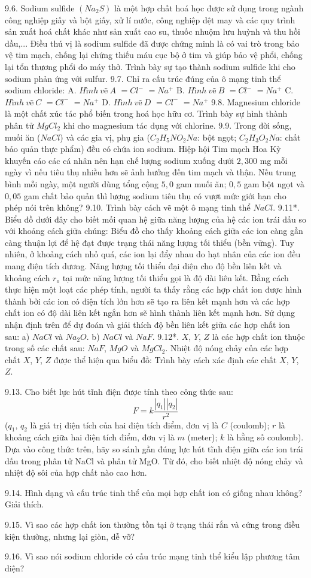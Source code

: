 9.6. Sodium sulfide $(Na_2S)$ là một hợp chất hoá học được sử dụng trong ngành công nghiệp giấy và bột giấy, xử lí nước, công nghiệp dệt may và các quy trình sản xuất hoá chất khác như sản xuất cao su, thuốc nhuộm lưu huỳnh và thu hồi dầu,... Điều thú vị là sodium sulfide đã được chứng minh là có vai trò trong bảo vệ tim mạch, chống lại chứng thiếu máu cục bộ ở tim và giúp bảo vệ phổi, chống lại tổn thương phổi do máy thở. Trình bày sự tạo thành sodium sulfide khi cho sodium phản ứng với sulfur.
9.7. Chỉ ra cấu trúc đúng của ô mạng tinh thể sodium chloride:
A. {$Hình\ vẽ\ A$}
$= Cl^-$ $= Na^+$
B. {$Hình\ vẽ\ B$}
$= Cl^-$ $= Na^+$
C. {$Hình\ vẽ\ C$}
$= Cl^-$ $= Na^+$
D. {$Hình\ vẽ\ D$}
$= Cl^-$ $= Na^+$
9.8. Magnesium chloride là một chất xúc tác phổ biến trong hoá học hữu cơ. Trình bày sự hình thành phân tử $MgCl_2$ khi cho magnesium tác dụng với chlorine.
9.9. Trong đời sống, muối ăn ($NaCl$) và các gia vị, phụ gia ($C_2H_5NO_2Na$: bột ngọt; $C_2H_3O_2Na$: chất bảo quản thực phẩm) đều có chứa ion sodium. Hiệp hội Tim mạch Hoa Kỳ khuyến cáo các cá nhân nên hạn chế lượng sodium xuống dưới $2,300$ mg mỗi ngày vì nếu tiêu thụ nhiều hơn sẽ ảnh hưởng đến tim mạch và thận. Nếu trung bình mỗi ngày, một người dùng tổng cộng $5,0$ gam muối ăn; $0,5$ gam bột ngọt và $0,05$ gam chất bảo quản thì lượng sodium tiêu thụ có vượt mức giới hạn cho phép nói trên không?
9.10. Trình bày cách vẽ một ô mạng tinh thể $NaCl$.
9.11*. Biểu đồ dưới đây cho biết mối quan hệ giữa năng lượng của hệ các ion trái dấu so với khoảng cách giữa chúng:
Biểu đồ cho thấy khoảng cách giữa các ion càng gần càng thuận lợi để hệ đạt được trạng thái năng lượng tối thiểu (bền vững). Tuy nhiên, ở khoảng cách nhỏ quá, các ion lại đẩy nhau do hạt nhân của các ion đều mang điện tích dương. Năng lượng tối thiểu đại diện cho độ bền liên kết và khoảng cách $r_o$ tại mức năng lượng tối thiểu gọi là độ dài liên kết. Bằng cách thực hiện một loạt các phép tính, người ta thấy rằng các hợp chất ion được hình thành bởi các ion có điện tích lớn hơn sẽ tạo ra liên kết mạnh hơn và các hợp chất ion có độ dài liên kết ngắn hơn sẽ hình thành liên kết mạnh hơn.
Sử dụng nhận định trên để dự đoán và giải thích độ bền liên kết giữa các hợp chất ion sau:
a) $NaCl$ và $Na_2O$.
b) $NaCl$ và $NaF$.
9.12*. $X$, $Y$, $Z$ là các hợp chất ion thuộc trong số các chất sau: $NaF$, $MgO$ và $MgCl_2$. Nhiệt độ nóng chảy của các hợp chất $X$, $Y$, $Z$ được thể hiện qua biểu đồ:
Trình bày cách xác định các chất $X$, $Y$, $Z$.

9.13. Cho biết lực hút tĩnh điện được tính theo công thức sau:
\[F = k \dfrac{|q_1||q_2|}{r^2}\]
($q_1$, $q_2$ là giá trị điện tích của hai điện tích điểm, đơn vị là $C$ (coulomb); $r$ là khoảng cách giữa hai điện tích điểm, đơn vị là $m$ (meter); $k$ là hằng số coulomb). Dựa vào công thức trên, hãy so sánh gần đúng lực hút tĩnh điện giữa các ion trái dấu trong phân tử NaCl và phân tử MgO. Từ đó, cho biết nhiệt độ nóng chảy và nhiệt độ sôi của hợp chất nào cao hơn.

9.14. Hình dạng và cấu trúc tinh thể của mọi hợp chất ion có giống nhau không? Giải thích.

9.15. Vì sao các hợp chất ion thường tồn tại ở trạng thái rắn và cứng trong điều kiện thường, nhưng lại giòn, dễ vỡ?

9.16. Vì sao nói sodium chloride có cấu trúc mạng tinh thể kiểu lập phương tâm diện?




